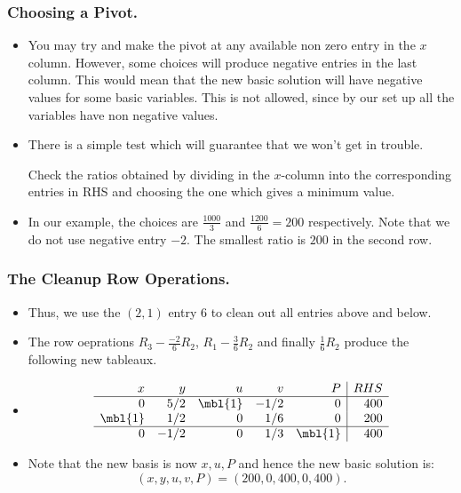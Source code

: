 
\begin{frame}%
  \frametitle{Choosing a Pivot.}
  \begin{itemize}%
 

\item
You may try and make the pivot at any available non zero entry in the
$x$ column. However, some choices will produce negative entries in the
last column. This would mean that the new basic solution will have
negative values for some basic variables. This is not allowed, since by
our set up all the variables have non negative values.

\item There is a simple test which will guarantee that we won't get in
trouble.

Check the ratios obtained by dividing  in the
$x$-column into the corresponding entries in RHS and choosing the one
which gives a minimum value.

\item In our example, the choices are $\frac{1000}{3}$ and
$\frac{1200}{6}=200$ respectively. Note that we do not use negative
entry $-2$. The smallest ratio is $200$ in the second row.


\end{itemize}
\end{frame}


\begin{frame}%
 \frametitle{The Cleanup Row Operations.}
  \begin{itemize}%

\item Thus, we use the $(2,1)$ entry $6$ to clean out all entries above
and below.

\item The row oeprations $R_3-\frac{-2}{6}R_2$, $R_1-\frac{3}{6}R_2$ and
finally $\frac{1}{6}R_2$ produce the following new tableaux.
\item
$$
\begin {array}{rrrrr|r}
x & y & u & v & P & RHS\\\hline
0&  5/2  & \mbl{1}&-1/2&0&400\\
\mbl{1} &1/2&0&1/6&0&200\\\hline
0&-1/2&0&1/3&\mbl{1}&400
\end {array}
$$


\item Note that the new basis is now $x,u,P$ and hence the new basic
solution is:
$$(x,y,u,v,P) = (200,0,400,0,400).$$

\end{itemize}
 
\end{frame}

